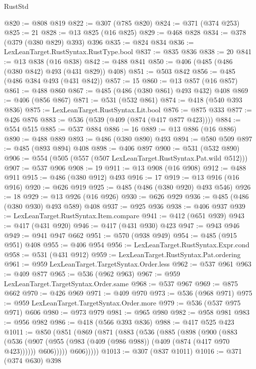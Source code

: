 \begin{lexlean}{RustStd}
\begin{coremodule}
@820 := @808 @819
@822 := @307 (@785 @820)
@824 := @371 (@374 @253)
@825 := 21
@828 := @13 @825 (@16 @825)
@829 := @468 @828
@834 := @378 (@379 (@380 @829) @393) @396
@835 := @824 @834
@836 := LexLeanTarget.RustSyntax.RustType.bool
@837 := @835 @836
@838 := 20
@841 := @13 @838 (@16 @838)
@842 := @488 @841
@850 := @406 (@485 (@486 (@380 @842) @493 (@431 @829)) @408)
@851 := @503 @842
@856 := @485 (@486 @384 @493 (@431 @842))
@857 := 15
@860 := @13 @857 (@16 @857)
@861 := @488 @860
@867 := @485 (@486 (@380 @861) @493 @432) @408
@869 := @406 (@856 @867)
@871 := @531 (@532 @861)
@874 := @418 (@540 @393 @836)
@875 := LexLeanTarget.RustSyntax.Lit.bool
@876 := @875 @333
@877 := @426 @876
@883 := @536 (@539 (@409 (@874 (@417 @877 @423))))
@884 := @554 @515
@885 := @537 @884
@886 := 16
@889 := @13 @886 (@16 @886)
@890 := @488 @889
@893 := @486 (@380 @890) @493
@894 := @580 @509
@897 := @485 (@893 @894) @408
@898 := @406 @897
@900 := @531 (@532 @890)
@906 := @554 (@505 (@557 (@507 LexLeanTarget.RustSyntax.Pat.wild @512)))
@907 := @537 @906
@908 := 19
@911 := @13 @908 (@16 @908)
@912 := @488 @911
@915 := @486 (@380 @912) @493
@916 := 17
@919 := @13 @916 (@16 @916)
@920 := @626 @919
@925 := @485 (@486 (@380 @920) @493 @546)
@926 := 18
@929 := @13 @926 (@16 @926)
@930 := @626 @929
@936 := @485 (@486 (@380 @930) @493 @589) @408
@937 := @925 @936
@938 := @406 @937
@939 := LexLeanTarget.RustSyntax.Item.compare
@941 := @412 (@651 @939)
@943 := @417 (@431 @920)
@946 := @417 (@431 @930) @423
@947 := @943 @946
@949 := @941 @947 @662
@951 := @570 (@938 @949)
@954 := @485 (@915 @951) @408
@955 := @406 @954
@956 := LexLeanTarget.RustSyntax.Expr.cond
@958 := @531 (@431 @912)
@959 := LexLeanTarget.RustSyntax.Pat.ordering
@961 := @959 LexLeanTarget.TargetSyntax.Order.less
@962 := @537 @961
@963 := @409 @877
@965 := @536 (@962 @963)
@967 := @959 LexLeanTarget.TargetSyntax.Order.same
@968 := @537 @967
@969 := @875 @662
@970 := @426 @969
@971 := @409 @970
@973 := @536 (@968 @971)
@975 := @959 LexLeanTarget.TargetSyntax.Order.more
@979 := @536 (@537 @975 @971) @606
@980 := @973 @979
@981 := @965 @980
@982 := @958 @981
@983 := @956 @982
@986 := @418 (@566 @393 @836)
@988 := @417 @525 @423
@1011 := @850
    (@851
      (@869
        (@871
          (@883
            (@536
              (@885
                (@898
                  (@900
                    (@883
                      (@536
                        (@907 (@955 (@983 (@409 (@986 @988)) (@409 (@874 (@417 @970 @423))))))
                        @606)))))
              @606)))))
@1013 := @307 (@837 @1011)
@1016 := @371 (@374 @630) @398

\end{coremodule}
\end{lexlean}
